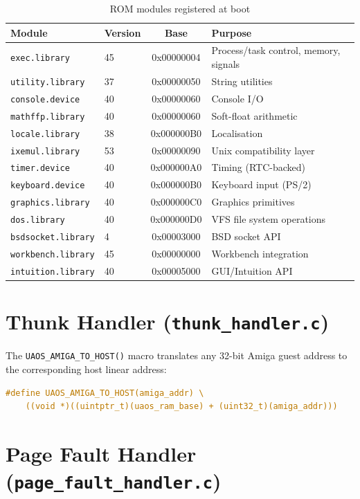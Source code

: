 \documentclass[11pt,a4paper]{report}
\begin{document}
\begin{table}[h]
\centering
\begin{tabular}{llcl}
\toprule
\textbf{Module} & \textbf{Version} & \textbf{Base} & \textbf{Purpose} \\
\midrule
\texttt{exec.library} & 45 & 0x00000004 & Process/task control, memory, signals \\
\texttt{utility.library} & 37 & 0x00000050 & String utilities \\
\texttt{console.device} & 40 & 0x00000060 & Console I/O \\
\texttt{mathffp.library} & 40 & 0x00000060 & Soft-float arithmetic \\
\texttt{locale.library} & 38 & 0x000000B0 & Localisation \\
\texttt{ixemul.library} & 53 & 0x00000090 & Unix compatibility layer \\
\texttt{timer.device} & 40 & 0x000000A0 & Timing (RTC-backed) \\
\texttt{keyboard.device} & 40 & 0x000000B0 & Keyboard input (PS/2) \\
\texttt{graphics.library} & 40 & 0x000000C0 & Graphics primitives \\
\texttt{dos.library} & 40 & 0x000000D0 & VFS file system operations \\
\texttt{bsdsocket.library} & 4 & 0x00003000 & BSD socket API \\
\texttt{workbench.library} & 45 & 0x00000000 & Workbench integration \\
\texttt{intuition.library} & 40 & 0x00005000 & GUI/Intuition API \\
\bottomrule
\end{tabular}
\caption{ROM modules registered at boot}
\label{tab:rommodules}
\end{table}

\section{Thunk Handler (\texttt{thunk\_handler.c})}

The \texttt{UAOS\_AMIGA\_TO\_HOST()} macro translates any 32-bit Amiga guest
address to the corresponding host linear address:
\begin{lstlisting}[language=C, caption={Address translation macro}]
#define UAOS_AMIGA_TO_HOST(amiga_addr) \
    ((void *)((uintptr_t)(uaos_ram_base) + (uint32_t)(amiga_addr)))
\end{lstlisting}

\section{Page Fault Handler (\texttt{page\_fault\_handler.c})}
\end{document}
